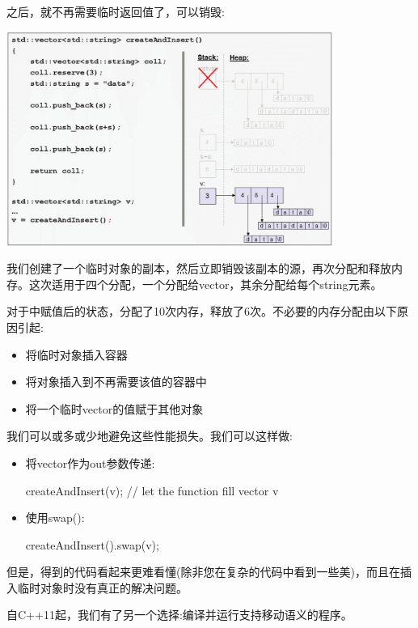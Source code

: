 \begin{itemize}
\begin{center}
	\end{center}
	之后，就不再需要临时返回值了，可以销毁:
\begin{center}
		\includegraphics[width=0.8\textwidth]{part1/ch1/images/9}
	\end{center}
	我们创建了一个临时对象的副本，然后立即销毁该副本的源，再次分配和释放内存。这次适用于四个分配，一个分配给vector，其余分配给每个string元素。
\end{itemize}

对于中赋值后的状态，分配了10次内存，释放了6次。不必要的内存分配由以下原因引起:

\begin{itemize}
	\item 将临时对象插入容器
	\item 将对象插入到不再需要该值的容器中
	\item 将一个临时vector的值赋于其他对象
\end{itemize}

我们可以或多或少地避免这些性能损失。我们可以这样做:

\begin{itemize}
	\item 将vector作为out参数传递:
\begin{cppcode}
createAndInsert(v); // let the function fill vector v
\end{cppcode}
	\item 使用swap():
\begin{cppcode}
createAndInsert().swap(v);
\end{cppcode}
\end{itemize}

但是，得到的代码看起来更难看懂(除非您在复杂的代码中看到一些美)，而且在插入临时对象时没有真正的解决问题。

自C++11起，我们有了另一个选择:编译并运行支持移动语义的程序。

